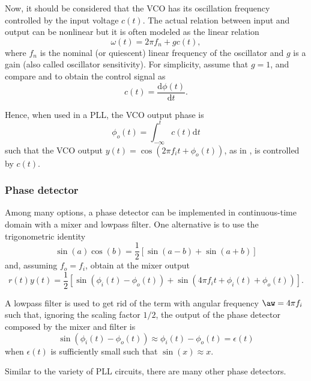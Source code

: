 Now, it should be considered that the VCO has its oscillation frequency controlled by the input voltage $c(t)$.
The actual relation between input and output can be nonlinear but it is often modeled
as the linear relation
\begin{equation}
\omega(t) = 2 \pi f_n + g c(t),
\label{eq:vco1}
\end{equation}
where $f_n$ is the nominal (or quiescent) linear frequency of the oscillator and $g$ is a gain (also called oscillator sensitivity). For simplicity, assume that $g=1$, 
and compare  and  to obtain the control signal as
\begin{equation}
c(t) = \frac{\textrm{d} \phi(t) }{\textrm{d} t}.
\label{eq:vcoControl}
\end{equation}

Hence, when used in a PLL, the VCO output phase is
\begin{equation}
\phi_o(t) = \int_{-\infty}^t c(t) \textrm{d}t
\label{eq:vcoIntegral}
\end{equation}
such that the VCO output $y(t)=\cos(2 \pi f_i t + \phi_o(t))$, as in , is controlled by $c(t)$. 

\subsubsection{Phase detector}

Among many options, a phase detector can be implemented in continuous-time domain with a mixer and lowpass filter. One alternative is to use the trigonometric identity
\[
\sin(a) \cos(b) = \frac{1}{2}[\sin(a-b) + \sin(a+b)]
\]
and, assuming $f_o = f_i$, obtain at the mixer output
\begin{equation}
r(t) y(t) = \frac{1}{2}[\sin(\phi_i(t) - \phi_o(t)) +  \sin(4 \pi f_i t + \phi_i(t) + \phi_o(t))].
\label{eq:mixerOutput}
\end{equation}


A lowpass filter is used to get rid of the term with angular frequency $\aw = 4 \pi f_i$ such that, 
ignoring the scaling factor $1/2$, the output of the phase detector composed by the mixer and filter is
\[
\sin(\phi_i(t) - \phi_o(t)) \approx \phi_i(t) - \phi_o(t) = \epsilon(t)
\]
when $\epsilon(t)$ is sufficiently small such that $\sin(x) \approx x$.

Similar to the variety of PLL circuits, there are many other phase detectors.

